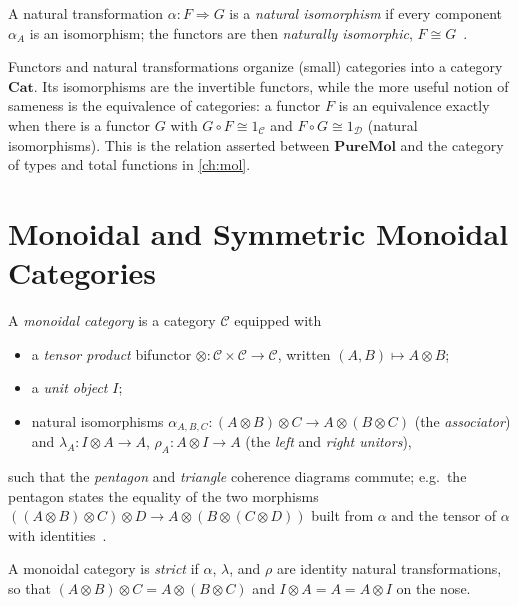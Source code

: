 \begin{definition}
A natural transformation $\alpha \colon F \Rightarrow G$ is a \emph{natural
isomorphism} if every component $\alpha_A$ is an isomorphism; the functors
are then \emph{naturally isomorphic}, $F \cong G$~\cite{maclane}.
\end{definition}

\begin{remark}
Functors and natural transformations organize (small) categories into a
category $\mathbf{Cat}$. Its isomorphisms are the invertible functors, while
the more useful notion of sameness is the equivalence of categories: a
functor $F$ is an equivalence exactly when there is a functor $G$ with
$G \circ F \cong 1_{\mathcal{C}}$ and $F \circ G \cong 1_{\mathcal{D}}$
(natural isomorphisms). This is the relation asserted between
$\mathbf{PureMol}$ and the category of types and total functions in
\autoref{ch:mol}.
\end{remark}

\section{Monoidal and Symmetric Monoidal Categories}\label{sec:prelim-mon}

\begin{definition}
A \emph{monoidal category} is a category $\mathcal{C}$ equipped with
\begin{itemize}
  \item a \emph{tensor product} bifunctor
        $\otimes \colon \mathcal{C} \times \mathcal{C} \to \mathcal{C}$,
        written $(A,B) \mapsto A \otimes B$;
  \item a \emph{unit object} $I$;
  \item natural isomorphisms $\alpha_{A,B,C} \colon (A \otimes B) \otimes C
        \to A \otimes (B \otimes C)$ (the \emph{associator}) and
        $\lambda_A \colon I \otimes A \to A$, $\rho_A \colon A \otimes I \to A$
        (the \emph{left} and \emph{right unitors}),
\end{itemize}
such that the \emph{pentagon} and \emph{triangle} coherence diagrams commute;
e.g.\ the pentagon states the equality of the two morphisms
$((A \otimes B) \otimes C) \otimes D \to A \otimes (B \otimes (C \otimes D))$
built from $\alpha$ and the tensor of $\alpha$ with identities~\cite{maclane}.
\end{definition}

\begin{definition}
A monoidal category is \emph{strict} if $\alpha$, $\lambda$, and $\rho$ are
identity natural transformations, so that $(A \otimes B) \otimes C
= A \otimes (B \otimes C)$ and $I \otimes A = A = A \otimes I$ on the nose.
\end{definition}

